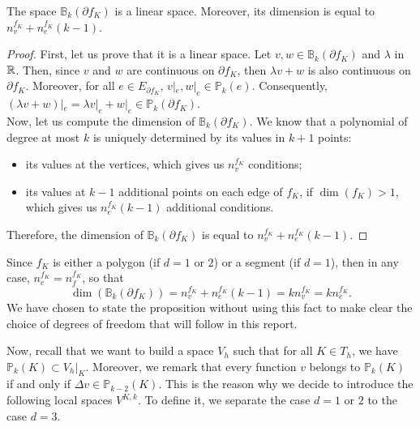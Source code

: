 \begin{proposition} \label{dimBk}
The space $\mathbb{B}_k(\partial f_K)$ is a linear space. Moreover, its dimension is equal to $n_v^{f_K}+n_e^{f_K}(k-1)$.
\end{proposition}

\begin{proof}
First, let us prove that it is a linear space. Let $v,w\in \mathbb{B}_k(\partial f_K)$ and $\lambda$ in $\mathbb{R}$. Then, since $v$ and $w$ are continuous on $\partial f_K$, then $\lambda v+w$ is also continuous on $\partial f_K$. Moreover, for all $e\in E_{\partial f_K}$, $v|_e, w|_e\in \mathbb{P}_k(e)$. Consequently, $\left(\lambda v + w\right)|_e = \lambda v|_e + w|_e \in \mathbb{P}_k(\partial f_K)$. \\
Now, let us compute the dimension of $\mathbb{B}_k(\partial f_K)$. We know that a polynomial of degree at most $k$ is uniquely determined by its values in $k+1$ points: 
\begin{itemize}
\item its values at the vertices, which gives us $n_v^{f_K}$ conditions;
\item its values at $k-1$ additional points on each edge of $f_K$, if $\dim(f_K)>1$, which gives us $n_e^{f_K}(k-1)$ additional conditions.
\end{itemize}
Therefore, the dimension of $\mathbb{B}_k(\partial f_K)$ is equal to $n_v^{f_K}+n_e^{f_K}(k-1)$. 
\end{proof}

\begin{remark}
Since $f_K$ is either a polygon (if $d=1$ or $2$) or a segment (if $d=1$), then in any case, $n_e^{f_K} = n_f^{f_K}$, so that $$\dim\left(\mathbb{B}_k\left(\partial f_K\right)\right) = n_v^{f_K}+n_e^{f_K}(k-1) = kn_v^{f_K} = kn_e^{f_K}.$$ 
We have chosen to state the proposition without using this fact to make clear the choice of degrees of freedom that will follow in this report.
\end{remark}

Now, recall that we want to build a space $V_h$ such that for all $K\in T_h$, we have $\mathbb{P}_k(K) \subset V_h|_K$. Moreover, we remark that every function $v$ belongs to $\mathbb{P}_k(K)$ if and only if $\Delta v\in \mathbb{P}_{k-2}(K)$. This is the reason why we decide to introduce the following local spaces $V^{K,k}$. To define it, we separate the case $d=1$ or $2$ to the case $d=3$. \newline 

